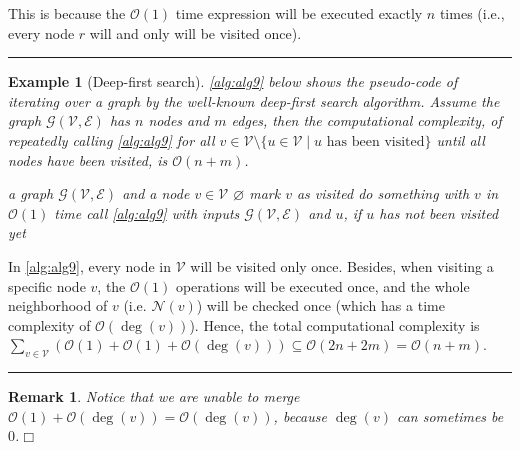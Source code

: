 \documentclass[twoside]{article}
\newcommand{\qedwhite}{\hfill \ensuremath{\Box}}
\newtheorem{remark}[theorem]{Remark}
\newtheorem{example}[theorem]{Example}
\newenvironment{proof}{{\bf Explanation:}}{\hfill\rule{2mm}{2mm}}
\begin{document}
\begin{proof}
    This is because the $\mathcal{O}(1)$ time expression will be executed exactly $n$ times (i.e., every node $r$ will and only will be visited once).
\end{proof}
\begin{example}[Deep-first search]\normalfont
    \autoref{alg:alg9} below shows the pseudo-code of iterating over a graph by the well-known \textit{deep-first search} algorithm. Assume the graph $\mathcal{G}(\mathcal{V},\mathcal{E})$ has $n$ nodes and $m$ edges, then the computational complexity, of {\color{red} repeatedly calling \autoref{alg:alg9} for all $v\in\mathcal{V}\setminus\{u\in\mathcal{V}\mid\text{$u$ has been visited}\}$ until all nodes have been visited}\reversemarginpar{}, is $\mathcal{O}(n+m)$.
\begin{algorithm}[!ht]
\begin{algorithmic}[1]
\REQUIRE a graph $\mathcal{G}(\mathcal{V},\mathcal{E})$ and a node $v\in\mathcal{V}$
\ENSURE $\varnothing$
\STATE mark $v$ as visited 
\STATE do something with $v$ in $\mathcal{O}(1)$ time
\STATE call \autoref{alg:alg9} with inputs $\mathcal{G}(\mathcal{V},\mathcal{E})$ and $u$, if $u$ has not been visited yet
\ENDFOR
\end{algorithmic}
\caption{Deep-first search}
\label{alg:alg9}
\end{algorithm}
\end{example}

\begin{proof}
    In \autoref{alg:alg9}, every node in $\mathcal{V}$ will be visited only once. Besides, when visiting a specific node $v$, the $\mathcal{O}(1)$ operations will be executed once, and the whole neighborhood of $v$ (i.e. $\mathcal{N}(v)$) will be checked once (which has a time complexity of $\mathcal{O}(\operatorname{deg}(v))$). Hence, the total computational complexity is $\sum_{v\in\mathcal{V}}(\mathcal{O}(1)+\mathcal{O}(1)+\mathcal{O}(\operatorname{deg}(v)))\subseteq\mathcal{O}(2n+2m)=\mathcal{O}(n+m)$.
\end{proof}

\begin{remark}\normalfont
    Notice that we are unable to merge $\mathcal{O}(1)+\mathcal{O}(\operatorname{deg}(v))=\mathcal{O}(\operatorname{deg}(v))$, because $\operatorname{deg}(v)$ can sometimes be $0$.\qedwhite
\end{remark}
\end{document}
